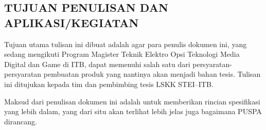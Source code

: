 \subsection*{\textcolor{subsectioncolor}{\textsf{TUJUAN PENULISAN DAN APLIKASI\slash KEGIATAN}}}

Tujuan utama tulisan ini dibuat adalah agar para penulis dokumen ini, yang sedang mengikuti Program Magister Teknik Elektro Opsi Teknologi Media Digital dan Game di ITB, dapat memenuhi salah satu dari persyaratan-persyaratan pembuatan produk yang nantinya akan menjadi bahan tesis.
Tulisan ini ditujukan kepada tim dan pembimbing tesis LSKK STEI--ITB.

Maksud dari penulisan dokumen ini adalah untuk memberikan rincian spesifikasi yang lebih dalam,
yang dari situ akan terlihat lebih jelas juga bagaimana PUSPA dirancang.
